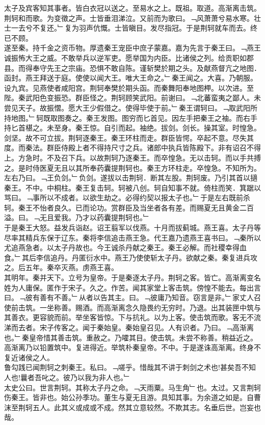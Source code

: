 \documentclass{zhvt-classic}
\begin{document}
\hspace*{2em}太子及宾客知其事者。皆白衣冠以送之。至易水之上。既祖。取道。高渐离击筑。荆轲和而歌。为变徵之声。士皆垂泪涕泣。又前而为歌曰。﹁风萧萧兮易水寒。壮士一去兮不复还。﹂复为羽声伉慨。士皆瞋目。发尽指冠。于是荆轲就车而去。终已不顾。\\
\hspace*{2em}遂至秦。持千金之资币物。厚遗秦王宠臣中庶子蒙嘉。嘉为先言于秦王曰。﹁燕王诚振怖大王之威。不敢举兵以逆军吏。愿举国为内臣。比诸侯之列。给贡职如郡县。而得奉守先王之宗庙。恐惧不敢自陈。谨斩樊於期之头。及献燕督亢之地图．函封。燕王拜送于庭。使使以闻大王。唯大王命之。﹂秦王闻之。大喜。乃朝服。设九宾。见燕使者咸阳宫。荆轲奉樊於期头函。而秦舞阳奉地图柙。以次进。至陛。秦武阳色变振恐。群臣怪之。荆轲顾笑武阳。前谢曰。﹁北蕃蛮夷之鄙人。未尝见天子。故振慴。愿大王少假借之。使得毕使于前。﹂秦王谓轲曰。﹁取武阳所持地图。﹂轲既取图奏之。秦王发图。图穷而匕首见。因左手把秦王之袖。而右手持匕首椹之。未至身。秦王惊。自引而起。袖绝。拔剑。剑长。操其室。时惶急。剑坚。故不可立拔。荆轲逐秦王。秦王环柱而走。群臣皆愕。卒起不意。尽失其度。而秦法。群臣侍殿上者不得持尺寸之兵。诸郎中执兵皆陈殿下。非有诏召不得上。方急时。不及召下兵。以故荆轲乃逐秦王。而卒惶急。无以击轲。而以手共搏之。是时侍医夏无且以其所奉药囊提荆轲也。秦王方环柱走。卒惶急。不知所为。左右乃曰。﹁王负剑。﹂负剑。遂拔以击荆轲．断其左股。荆轲废。乃引其首以擿秦王。不中。中桐柱。秦王复击轲。轲被八创。轲自知事不就。倚柱而笑．箕踞以骂曰。﹁事所以不成者。以欲生劫之。必得约契以报太子也。﹂于是左右既前杀轲。秦王不怡者良久。已而论功。赏群臣及当坐者各有差。而赐夏无且黄金二百溢。曰。﹁无且爱我。乃才以药囊提荆轲也。﹂\\
\hspace*{2em}于是秦王大怒。益发兵诣赵。诏王翦军以伐燕。十月而拔蓟城。燕王喜。太子丹等尽率其精兵东保于辽东。秦将李信追击燕王急。代王嘉乃遗燕王喜书曰。﹁秦所以尤追燕急者。以太子丹故也。今王诚杀丹献之秦王。秦王必解。而社稷幸得血食。﹂其后李信追丹。丹匿衍水中。燕王乃使使斩太子丹。欲献之秦。秦复进兵攻之。后五年。秦卒灭燕。虏燕王喜。\\
\hspace*{2em}其明年。秦并天下。立号为皇帝。于是秦逐太子丹。荆轲之客。皆亡。高渐离变名姓为人庸保。匿作于宋子。久之。作苦。闻其家堂上客击筑。傍惶不能去。每出言曰。﹁彼有善有不善。﹂从者以告其主。曰。﹁彼庸乃知音。窃言是非。﹂家丈人召使前击筑。一坐称善。赐酒。而高渐离念久隐畏约无穷时。乃退。出其装匣中筑与其善衣。更容貌而前。举坐客皆惊。下与抗礼。以为上客。使击筑而歌。客无不流涕而去者。宋子传客之。闻于秦始皇。秦始皇召见。人有识者。乃曰。﹁高渐离也。﹂秦皇帝惜其善击筑。重赦之。乃嚯其目。使击筑。未尝不称善。稍益近之。高渐离乃以铅置筑中。复进得近。举筑朴秦皇帝。不中。于是遂诛高渐离。终身不复近诸侯之人。\\
\hspace*{2em}鲁勾践已闻荆轲之刺秦王。私曰。﹁嗟乎。惜哉其不讲于刺剑之术也!甚矣吾不知人也!曩者吾叱之。彼乃以我为非人也。﹂\\
\hspace*{2em}太史公曰。世言荆轲。其称太子丹之命。﹁天雨粟。马生角﹂也。太过。又言荆轲伤秦王。皆非也。始公孙季功。董生与夏无且游。具知其事。为余道之如是。自曹沫至荆轲五人。此其义或成或不成。然其立意较然。不欺其志。名垂后世。岂妄也哉。\\
\end{document}
